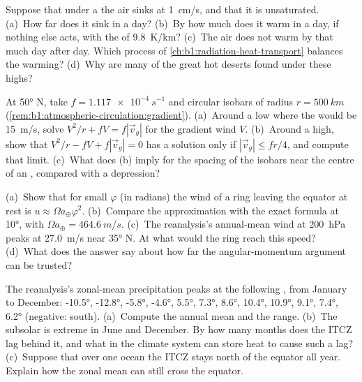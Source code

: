 \begin{exercise}[$\star\star$]\label{exo:b1:atmospheric-circulation:9}
Suppose that under a  the air sinks at \qty{1}{cm/s}, and that it is
unsaturated. (a)~How far does it sink in a day? (b)~By how much does it warm in a day,
if nothing else acts, with the  of \qty{9.8}{K/km}? (c)~The
air does not warm by that much day after day. Which process of
\cref{ch:b1:radiation-heat-transport} balances the warming? (d)~Why are many of the
great hot deserts found under these highs?
\end{exercise}

\begin{exercise}[$\star\star\star$]\label{exo:b1:atmospheric-circulation:10}
At \ang{50} N, take $f = \qty{1.117e-4}{s^{-1}}$ and circular isobars of radius
$r = \qty{500}{km}$ (\cref{rem:b1:atmospheric-circulation:gradient}). (a)~Around a
low where the  would be \qty{15}{m/s}, solve $V^2/r + fV =
f|\vec v_g|$ for the gradient wind $V$. (b)~Around a high, show that $V^2/r - fV + f
|\vec v_g| = 0$ has a solution only if $|\vec v_g| \leq fr/4$, and compute that limit.
(c)~What does (b) imply for the spacing of the isobars near the centre of an
, compared with a depression?
\end{exercise}

\begin{exercise}[$\star\star\star$]\label{exo:b1:atmospheric-circulation:11}
(a)~Show that for small $\varphi$ (in radians) the wind of a ring leaving the equator
at rest is $u \approx \Omega a_\oplus\varphi^2$. (b)~Compare the approximation with
the exact formula at \ang{10}, with $\Omega a_\oplus = \qty{464.6}{m/s}$. (c)~The
reanalysis's annual-mean wind at \qty{200}{hPa} peaks at \qty{27.0}{m/s} near
\ang{35} N. At what  would the ring reach this speed? (d)~What does the
answer say about how far the angular-momentum argument can be trusted?
\end{exercise}

\begin{exercise}[$\star\star\star$]\label{exo:b1:atmospheric-circulation:12}
The reanalysis's zonal-mean precipitation peaks at the following , from
January to December: \ang{-10.5}, \ang{-12.8}, \ang{-5.8}, \ang{-4.6}, \ang{5.5},
\ang{7.3}, \ang{8.6}, \ang{10.4}, \ang{10.9}, \ang{9.1}, \ang{7.4}, \ang{6.2}
(negative: south). (a)~Compute the annual mean and the range. (b)~The subsolar
 is extreme in June and December. By how many months does the ITCZ lag
behind it, and what in the climate system can store heat to cause such a lag?
(c)~Suppose that over one ocean the ITCZ stays north of the equator all year. Explain
how the zonal mean can still cross the equator.
\end{exercise}

